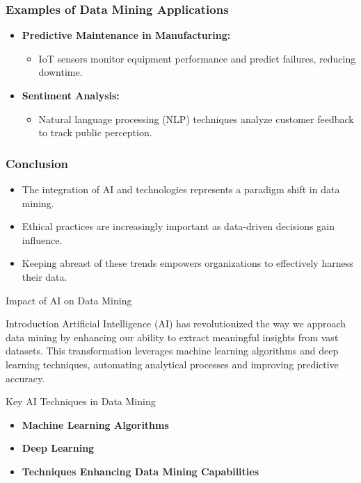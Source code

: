 \documentclass[aspectratio=169]{beamer}
\begin{document}
\begin{frame}[fragile]
    \frametitle{Examples of Data Mining Applications}
    \begin{itemize}
        \item \textbf{Predictive Maintenance in Manufacturing:} 
            \begin{itemize}
                \item IoT sensors monitor equipment performance and predict failures, reducing downtime.
            \end{itemize}
        \item \textbf{Sentiment Analysis:} 
            \begin{itemize}
                \item Natural language processing (NLP) techniques analyze customer feedback to track public perception.
            \end{itemize}
    \end{itemize}
\end{frame}

\begin{frame}[fragile]
    \frametitle{Conclusion}
    \begin{itemize}
        \item The integration of AI and technologies represents a paradigm shift in data mining.
        \item Ethical practices are increasingly important as data-driven decisions gain influence.
        \item Keeping abreast of these trends empowers organizations to effectively harness their data.
    \end{itemize}
\end{frame}

\begin{frame}[fragile]{Impact of AI on Data Mining}
    \begin{block}{Introduction}
        Artificial Intelligence (AI) has revolutionized the way we approach data mining by enhancing our ability to extract meaningful insights from vast datasets. This transformation leverages machine learning algorithms and deep learning techniques, automating analytical processes and improving predictive accuracy.
    \end{block}
\end{frame}

\begin{frame}[fragile]{Key AI Techniques in Data Mining}
    \begin{itemize}
        \item \textbf{Machine Learning Algorithms}
        \item \textbf{Deep Learning}
        \item \textbf{Techniques Enhancing Data Mining Capabilities}
    \end{itemize}
\end{frame}
\end{document}
